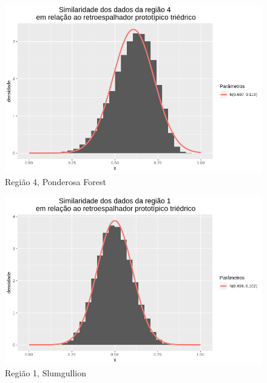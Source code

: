 \documentclass[12pt]{article}
\begin{document}
\begin{figure}[!h]
    \centering
    \vspace{0.1\linewidth}
    \includegraphics[width = \linewidth]{../../Images/Report_18_12_20/ponder_tri_region4.png}
    \caption{Região 4, Ponderosa Forest}
    \label{fig:pond_tri_r4}
\end{figure}

\begin{figure}[!h]
    \centering
    \vspace{0.1\linewidth}
    \includegraphics[width = \linewidth]{../../Images/Report_18_12_20/slum_tri_region1.png}
    \caption{Região 1, Slumgullion}
    \label{fig:slum_tri_r1}
\end{figure}
\end{document}

